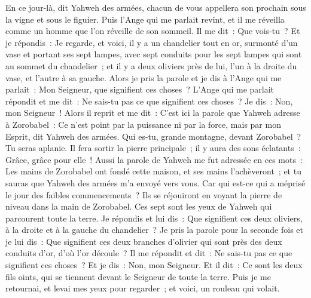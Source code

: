 \begin{multicols}{2}
En ce jour-là, dit Yahweh des armées, chacun de vous appellera son prochain sous la vigne et sous le figuier.
\VerseOne{}Puis l'Ange qui me parlait revint, et il me réveilla comme un homme que l'on réveille de son sommeil.
Il me dit~: Que vois-tu~? Et je répondis~: Je regarde, et voici, il y a un chandelier tout en or, surmonté d'un vase et portant ses sept lampes, avec sept conduits pour les sept lampes qui sont au sommet du chandelier~;
et il y a deux oliviers près de lui, l'un à la droite du vase, et l'autre à sa gauche.
Alors je pris la parole et je dis à l'Ange qui me parlait~: Mon Seigneur, que signifient ces choses~?
L'Ange qui me parlait répondit et me dit~: Ne sais-tu pas ce que signifient ces choses~? Je dis~: Non, mon Seigneur~!
Alors il reprit et me dit~: C'est ici la parole que Yahweh adresse à Zorobabel~: Ce n'est point par la puissance ni par la force, mais par mon Esprit, dit Yahweh des armées.
Qui es-tu, grande montagne, devant Zorobabel~? Tu seras aplanie. Il fera sortir la pierre principale~; il y aura des sons éclatants~: Grâce, grâce pour elle~!
Aussi la parole de Yahweh me fut adressée en ces mots~:
Les mains de Zorobabel ont fondé cette maison, et ses mains l'achèveront~; et tu sauras que Yahweh des armées m'a envoyé vers vous.
Car qui est-ce qui a méprisé le jour des faibles commencements~? Ils se réjouiront en voyant la pierre de niveau dans la main de Zorobabel. Ces sept sont les yeux de Yahweh qui parcourent toute la terre.
Je répondis et lui dis~: Que signifient ces deux oliviers, à la droite et à la gauche du chandelier~?
Je pris la parole pour la seconde fois et je lui dis~: Que signifient ces deux branches d'olivier qui sont près des deux conduits d'or, d'où l'or découle~?
Il me répondit et dit~: Ne sais-tu pas ce que signifient ces choses~? Et je dis~: Non, mon Seigneur.
Et il dit~: Ce sont les deux fils oints, qui se tiennent devant le Seigneur de toute la terre.
\VerseOne{}Puis je me retournai, et levai mes yeux pour regarder~; et voici, un rouleau qui volait.

\end{multicols}
